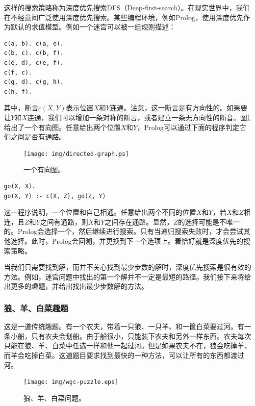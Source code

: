 \documentclass[UTF8]{article}
\begin{document}
这样的搜索策略称为深度优先搜索DFS（Deep-first-search）。在现实世界中，我们在不经意间广泛使用深度优先搜索。某些编程环境，例如Prolog，使用深度优先作为默认的求值模型。例如一个迷宫可以被一组规则描述：

\lstset{language=Prolog}
\begin{lstlisting}
c(a, b). c(a, e).
c(b, c). c(b, f).
c(e, d), c(e, f).
c(f, c).
c(g, d). c(g, h).
c(h, f).
\end{lstlisting}

其中，断言$c(X, Y)$表示位置$X$和$Y$连通。注意，这一断言是有方向性的。如果要让$Y$和$X$连通，我们可以增加一条对称的断言，或者建立一条无方向性的断音。图\ref{fig:directed-graph}给出了一个有向图。任意给出两个位置$X$和$Y$，Prolog可以通过下面的程序判定它们之间是否有通路。

\begin{figure}[htbp]
 \centering
 \texttt{[image: img/directed-graph.ps]}
 \caption{一个有向图。}
 \label{fig:directed-graph}
\end{figure}

\lstset{language=Prolog}
\begin{lstlisting}
go(X, X).
go(X, Y) :- c(X, Z), go(Z, Y)
\end{lstlisting}

这一程序说明，一个位置和自己相通。任意给出两个不同的位置$X$和$Y$，若$X$和$Z$相连，且$Z$和$Y$之间有通路，则$X$和$Y$之间存在通路。显然，$Z$的选择可能是不唯一的。Prolog会选择一个，然后继续进行搜索。只有当递归搜索失败时，才会尝试其他选择。此时，Prolog会回溯，并更换到下一个选项上。着恰好就是深度优先的搜索策略。

当我们只需要找到解，而并不关心找到最少步数的解时，深度优先搜索是很有效的方法。例如，迷宫问题中找出的第一个解并不一定是最短的路径。我们接下来将给出更多的趣题，并给出找出最少步数解的方法。

\subsubsection{狼、羊、白菜趣题}

这是一道传统趣题。有一个农夫，带着一只狼、一只羊、和一筐白菜要过河。有一条小船，只有农夫会划船。由于船很小，只能装下农夫和另外一样东西。农夫每次只能在狼、羊、白菜中任选一样和他一起过河。但是如果农夫不在，狼会吃掉羊，而羊会吃掉白菜。这道题目要求找到最快的一种方法，可以让所有的东西都渡过河。

\begin{figure}[htbp]
 \centering
 \texttt{[image: img/wgc-puzzle.eps]}
 \caption{狼、羊、白菜问题。}
 \label{fig:wgc-puzzle}
\end{figure}
\end{document}
